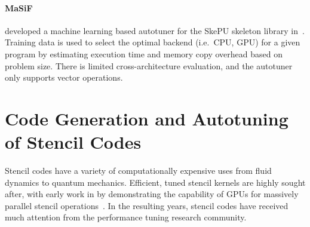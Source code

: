 
%
\paragraph{MaSiF} 


\citeauthor{Dastgeer2011} developed a machine learning based autotuner
for the SkePU skeleton library in~\cite{Dastgeer2011}. Training data
is used to select the optimal backend (i.e.\ CPU, GPU) for a given
program by estimating execution time and memory copy overhead based on
problem size. There is limited cross-architecture evaluation, and the
autotuner only supports vector operations.



\section{Code Generation and Autotuning of Stencil Codes}

Stencil codes have a variety of computationally expensive uses from
fluid dynamics to quantum mechanics. Efficient, tuned stencil kernels
are highly sought after, with early work in \citeyear{Bolz2003} by
\citeauthor{Bolz2003} demonstrating the capability of GPUs for
massively parallel stencil operations~\cite{Bolz2003}. In the
resulting years, stencil codes have received much attention from the
performance tuning research community.


